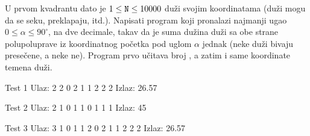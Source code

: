 \begin{Answer}[ref=409]
\end{Answer}
\begin{Exercise}[difficulty=2, label=410]
  U prvom kvadrantu dato je $1 \leq \texttt{N} \leq 10000$ duži svojim
  koordinatama (duži mogu da se seku, preklapaju, itd.). Napisati
  program koji pronalazi najmanji ugao $0 \leq \alpha \leq 90^\circ$,
  na dve decimale, takav da je suma dužina duži sa obe strane
  polupoluprave iz koordinatnog početka pod uglom $\alpha$ jednak
  (neke duži bivaju presečene, a neke ne). Program prvo učitava broj
  , a zatim i same koordinate temena duži. 
  
\begin{minitest}
\begin{test}{Test 1}
Ulaz:
  2
  2 0 2 1
  1 2 2 2
Izlaz:
  26.57 
\end{test}
\end{minitest}
\begin{minitest}
\begin{test}{Test 2}
Ulaz:
  2
  1 0 1 1
  0 1 1 1
Izlaz:
  45
\end{test}
\end{minitest}
\begin{minitest}
\begin{test}{Test 3}
Ulaz:
  3
  1 0 1 1
  2 0 2 1
  1 2 2 2
Izlaz:
  26.57 
\end{test}
\end{minitest}


\end{Exercise}

